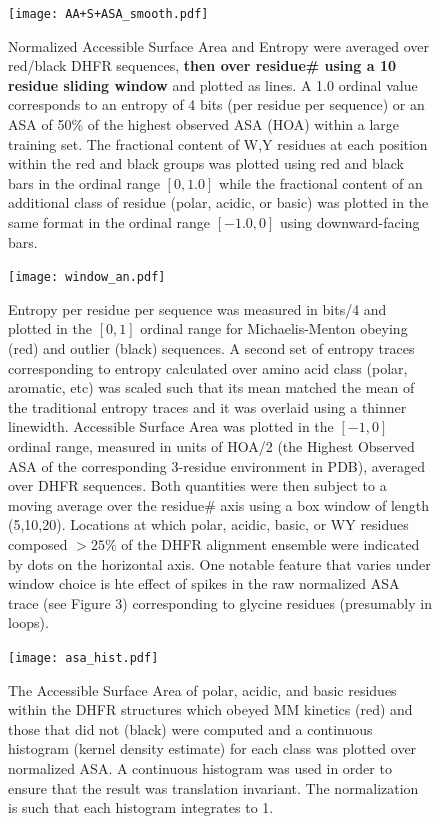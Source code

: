 \documentclass[a4paper,11pt]{article}
\begin{document}
\begin{figure}[a]
\centerline{\texttt{[image: AA+S+ASA\_smooth.pdf]}}
\caption[Moving-Averages of $S_{\rm all}$, $ASA_{\rm all}$, WY/Polar/Acidic/Basic Content vs Residue \#]{Normalized Accessible Surface Area and Entropy were averaged over red/black DHFR sequences, \textbf{then over residue\# using a 10 residue sliding window} and plotted as lines. A 1.0 ordinal value corresponds to an entropy of 4 bits (per residue per sequence) or an ASA of 50\% of the highest observed ASA (HOA) within a large training set. The fractional content of W,Y residues at each position within the red and black groups was plotted using red and black bars in the ordinal range $[0,1.0]$ while the fractional content of an additional class of residue (polar, acidic, or basic) was plotted in the same format in the ordinal range $[-1.0,0]$ using downward-facing bars.}
\end{figure}


\begin{figure}
\centerline{\texttt{[image: window\_an.pdf]}}
\caption[Moving Averages of $S_{\rm red},S_{\rm black},ASA_{\rm red},ASA_{\rm 
black}$ for Windows of (5,10,20) Residues]{Entropy per residue per sequence was measured in bits/4 and plotted in the $[0,1]$ ordinal range for Michaelis-Menton obeying (red) and outlier (black) sequences. A second set of entropy traces corresponding to entropy calculated over amino acid class (polar, aromatic, etc) was scaled such that its mean matched the mean of the traditional entropy traces and it was overlaid using a thinner linewidth. Accessible Surface Area was plotted in the $[-1,0]$ ordinal range, measured in units of HOA/2 (the Highest Observed ASA of the corresponding 3-residue environment in PDB), averaged over DHFR sequences. Both quantities were then subject to a moving average over the residue\# axis using a box window of length (5,10,20). Locations at which polar, acidic, basic, or WY residues composed $>25\%$ of the DHFR alignment ensemble were indicated by dots on the horizontal axis. One notable feature that varies under window choice is hte effect of spikes in the raw normalized ASA trace (see Figure 3) corresponding to glycine residues (presumably in loops).}
\end{figure}



\begin{figure}
\centerline{\texttt{[image: asa\_hist.pdf]}}
\caption[Histogram of (Polar,Acidic,Basic) ASA over MM, Outlier Groups]{The Accessible Surface Area of polar, acidic, and basic residues within the DHFR structures which obeyed MM kinetics (red) and those that did not (black) were computed and a continuous histogram (kernel density estimate) for each class was plotted over normalized ASA. A continuous histogram was used in order to ensure that the result was translation invariant. The normalization is such that each histogram integrates to 1.}
\end{figure}
\end{document}
